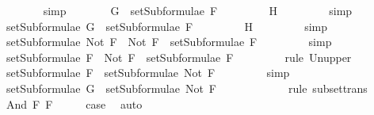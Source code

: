 \begin{isabellebody}
\ \ \ \ \ \ \isamarkupfalse%
\ simp\isanewline
\ \ \ \ \isamarkupfalse%
\ \isamarkupfalse%
\ {\isachardoublequoteopen}G\ {\isasymin}\ setSubformulae\ F{\isachardoublequoteclose}\ \isanewline
\ \ \ \ \ \ \isamarkupfalse%
\ H{}\ \isanewline
\ \ \ \ \ \ \isamarkupfalse%
\ simp\isanewline
\ \ \ \ \isamarkupfalse%
\ \isamarkupfalse%
\ {}{\isacharcolon}{\isachardoublequoteopen}setSubformulae\ G\ {\isasymsubseteq}\ setSubformulae\ F{\isachardoublequoteclose}\ \isanewline
\ \ \ \ \ \ \isamarkupfalse%
\ H{}\ \isanewline
\ \ \ \ \ \ \isamarkupfalse%
\ simp\isanewline
\ \ \ \ \isamarkupfalse%
\ {\isachardoublequoteopen}setSubformulae\ {\isacharparenleft}Not\ F{\isacharparenright}\ {\isacharequal}\ {\isacharbraceleft}Not\ F{\isacharbraceright}\ {\isasymunion}\ setSubformulae\ F{\isachardoublequoteclose}\ \isanewline
\ \ \ \ \ \ \isamarkupfalse%
\ simp\isanewline
\ \ \ \ \isamarkupfalse%
\ {\isachardoublequoteopen}setSubformulae\ F\ {\isasymsubseteq}\ {\isacharbraceleft}Not\ F{\isacharbraceright}\ {\isasymunion}\ setSubformulae\ F{\isachardoublequoteclose}\ \isanewline
\ \ \ \ \ \ \isamarkupfalse%
\ {\isacharparenleft}rule\ Un{\isacharunderscore}upper{}{\isacharparenright}\isanewline
\ \ \ \ \isamarkupfalse%
\ \isamarkupfalse%
\ {}{\isacharcolon}{\isachardoublequoteopen}setSubformulae\ F\ {\isasymsubseteq}\ setSubformulae\ {\isacharparenleft}Not\ F{\isacharparenright}{\isachardoublequoteclose}\ \isanewline
\ \ \ \ \ \ \isamarkupfalse%
\ simp\isanewline
\ \ \ \ \isamarkupfalse%
\ {\isachardoublequoteopen}setSubformulae\ G\ {\isasymsubseteq}\ setSubformulae\ {\isacharparenleft}Not\ F{\isacharparenright}{\isachardoublequoteclose}\ \isanewline
\ \ \ \ \ \ \isamarkupfalse%
\ {}\ {}\ \isamarkupfalse%
\ {\isacharparenleft}rule\ subset{\isacharunderscore}trans{\isacharparenright}\isanewline
\ \ \isamarkupfalse%
\isanewline
{}\isamarkupfalse%
\isanewline
\ \ \isamarkupfalse%
\ {\isacharparenleft}And\ F{}\ F{}{\isacharparenright}\isanewline
\ \ \isamarkupfalse%
\ \isamarkupfalse%
\ {\isacharquery}case\ \isamarkupfalse%
\ auto\isanewline
{}\isamarkupfalse%

\end{isabellebody}
